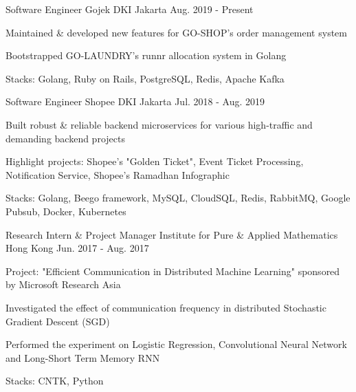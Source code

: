 

\begin{cventries}

  \cventry
    {Software Engineer} %
    {Gojek} %
    {DKI Jakarta} %
    {Aug. 2019 - Present} %
    {
      \begin{cvitems} %
        \item {Maintained \& developed new features for GO-SHOP's order management system}
        \item {Bootstrapped GO-LAUNDRY's runnr allocation system in Golang}
        \item {Stacks: Golang, Ruby on Rails, PostgreSQL, Redis, Apache Kafka}
      \end{cvitems}
    }

  \cventry
    {Software Engineer} %
    {Shopee} %
    {DKI Jakarta} %
    {Jul. 2018 - Aug. 2019} %
    {
      \begin{cvitems} %
        \item {Built robust \& reliable backend microservices for various high-traffic and demanding backend projects}
        \item {Highlight projects: Shopee's "Golden Ticket", Event Ticket Processing, Notification Service, Shopee's Ramadhan Infographic}
        \item {Stacks: Golang, Beego framework, MySQL, CloudSQL, Redis, RabbitMQ, Google Pubsub, Docker, Kubernetes}
      \end{cvitems}
    }



  \cventry
    {Research Intern \& Project Manager} %
    {Institute for Pure \& Applied Mathematics} %
    {Hong Kong} %
    {Jun. 2017 - Aug. 2017} %
    {
      \begin{cvitems} %
        \item {Project: "Efficient Communication in Distributed Machine Learning" sponsored by Microsoft Research Asia}
        \item {Investigated the effect of communication frequency in distributed Stochastic Gradient Descent (SGD)}
        \item {Performed the experiment on Logistic Regression, Convolutional Neural Network and Long-Short Term Memory RNN}
        \item {Stacks: CNTK, Python}
      \end{cvitems}
    }


\end{cventries}
